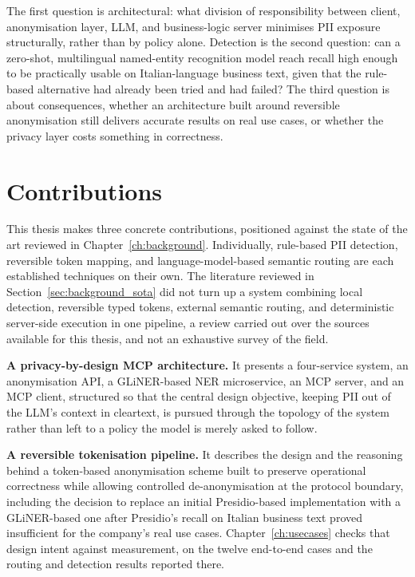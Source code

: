 The first question is architectural: what division of responsibility between client, anonymisation layer, LLM, and business-logic server minimises PII exposure structurally, rather than by policy alone. Detection is the second question: can a zero-shot, multilingual named-entity recognition model reach recall high enough to be practically usable on Italian-language business text, given that the rule-based alternative had already been tried and had failed? The third question is about consequences, whether an architecture built around reversible anonymisation still delivers accurate results on real use cases, or whether the privacy layer costs something in correctness.

\section{Contributions}
\label{sec:intro_contributions}

This thesis makes three concrete contributions, positioned against the state of the art reviewed in Chapter~\ref{ch:background}. Individually, rule-based PII detection, reversible token mapping, and language-model-based semantic routing are each established techniques on their own. The literature reviewed in Section~\ref{sec:background_sota} did not turn up a system combining local detection, reversible typed tokens, external semantic routing, and deterministic server-side execution in one pipeline, a review carried out over the sources available for this thesis, and not an exhaustive survey of the field.

\textbf{A privacy-by-design MCP architecture.} It presents a four-service system, an anonymisation API, a GLiNER-based NER microservice, an MCP server, and an MCP client, structured so that the central design objective, keeping PII out of the LLM's context in cleartext, is pursued through the topology of the system rather than left to a policy the model is merely asked to follow.

\textbf{A reversible tokenisation pipeline.} It describes the design and the reasoning behind a token-based anonymisation scheme built to preserve operational correctness while allowing controlled de-anonymisation at the protocol boundary, including the decision to replace an initial Presidio-based implementation with a GLiNER-based one after Presidio's recall on Italian business text proved insufficient for the company's real use cases. Chapter~\ref{ch:usecases} checks that design intent against measurement, on the twelve end-to-end cases and the routing and detection results reported there.

